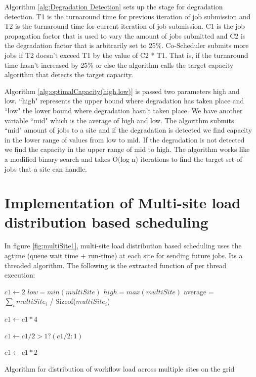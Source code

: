 \documentclass[ms,electronic,double]{nuthesis}
\begin{document}
Algorithm \ref{alg:Degradation Detection} sets up the stage for degradation 
detection. T1 is the turnaround time for previous iteration of job submission
and T2 is the turnaround time for current iteration of job submission. C1 is the 
job propagation factor that is used to vary the amount of jobs submitted and C2 
is the degradation factor that is arbitrarily set to 25\%.
Co-Scheduler submits more jobs if T2 doesn't exceed T1 by the value of C2 * T1. That is, if the turnaround time
hasn't increased by 25\% or else the 
algorithm calls the target capacity algorithm that detects the target capacity.

Algorithm \ref{alg:optimalCapacity(high,low)} is passed two parameters high and 
low. ``high" represents the upper bound where degradation has taken place and ``low" the lower bound 
where degradation hasn't taken place. We have another variable ``mid" which is the average of high and low.
The algorithm submits ``mid" amount of jobs to a site and if the degradation is detected we find capacity in
the lower range of values from low to mid. If the degradation is not detected we find the capacity in 
the upper range of mid to high. The algorithm works like a modified binary 
search and takes O(log n) iterations to find the target set of jobs that a site can handle.

\section{Implementation of Multi-site load distribution based scheduling}
In figure \ref{fig:multiSite1}, multi-site load distribution based scheduling uses the agtime (queue wait time + run-time) at each 
site for sending future jobs. Its a threaded algorithm. The following is the extracted function of per thread execution:

\begin{algorithm}
\begin{algorithmic}

\STATE $c1 \gets 2$ 
\STATE $low = min(multiSite)$
\STATE $high = max(multiSite)$
\STATE average = $\sum_i multiSite_i$ / Sizeof($multiSite_i$)

\STATE $c1 \gets c1 * 4$
\ENDIF

\STATE $c1 \gets c1/2>1 ? (c1/2:1)$
\ENDIF

\STATE $c1 \gets c1 * 2$
\ENDIF

\end{algorithmic}
\caption{Algorithm for distribution of workflow load across multiple sites on the grid}
\label{alg:updateJobPropagationConstant()}
\end{algorithm}
\end{document}
